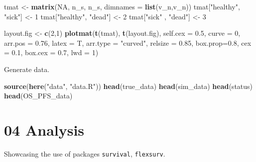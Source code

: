 \documentclass[
]{article}
\newenvironment{Shaded}{\begin{snugshade}}{\end{snugshade}}
\newcommand{\DataTypeTok}[1]{\textcolor[rgb]{0.13,0.29,0.53}{#1}}
\newcommand{\DecValTok}[1]{\textcolor[rgb]{0.00,0.00,0.81}{#1}}
\newcommand{\FloatTok}[1]{\textcolor[rgb]{0.00,0.00,0.81}{#1}}
\newcommand{\KeywordTok}[1]{\textcolor[rgb]{0.13,0.29,0.53}{\textbf{#1}}}
\newcommand{\NormalTok}[1]{#1}
\newcommand{\OtherTok}[1]{\textcolor[rgb]{0.56,0.35,0.01}{#1}}
\newcommand{\StringTok}[1]{\textcolor[rgb]{0.31,0.60,0.02}{#1}}
\begin{document}
\begin{Shaded}
\begin{Highlighting}[]
\NormalTok{tmat <-}\StringTok{ }\KeywordTok{matrix}\NormalTok{(}\OtherTok{NA}\NormalTok{, n_s, n_s, }\DataTypeTok{dimnames =} \KeywordTok{list}\NormalTok{(v_n,v_n))}
\NormalTok{tmat[}\StringTok{"healthy"}\NormalTok{, }\StringTok{"sick"}\NormalTok{]  <-}\StringTok{ }\DecValTok{1}
\NormalTok{tmat[}\StringTok{"healthy"}\NormalTok{, }\StringTok{"dead"}\NormalTok{]  <-}\StringTok{ }\DecValTok{2}
\NormalTok{tmat[}\StringTok{"sick"}\NormalTok{   , }\StringTok{"dead"}\NormalTok{]  <-}\StringTok{ }\DecValTok{3}

\NormalTok{layout.fig <-}\StringTok{ }\KeywordTok{c}\NormalTok{(}\DecValTok{2}\NormalTok{,}\DecValTok{1}\NormalTok{)}
\KeywordTok{plotmat}\NormalTok{(}\KeywordTok{t}\NormalTok{(tmat), }\KeywordTok{t}\NormalTok{(layout.fig), }\DataTypeTok{self.cex =} \FloatTok{0.5}\NormalTok{, }\DataTypeTok{curve =} \DecValTok{0}\NormalTok{, }\DataTypeTok{arr.pos =} \FloatTok{0.76}\NormalTok{,  }
        \DataTypeTok{latex =}\NormalTok{ T, }\DataTypeTok{arr.type =} \StringTok{"curved"}\NormalTok{, }\DataTypeTok{relsize =} \FloatTok{0.85}\NormalTok{, }\DataTypeTok{box.prop=}\FloatTok{0.8}\NormalTok{, }
        \DataTypeTok{cex =} \FloatTok{0.1}\NormalTok{, }\DataTypeTok{box.cex =} \FloatTok{0.7}\NormalTok{, }\DataTypeTok{lwd =} \DecValTok{1}\NormalTok{)}
\end{Highlighting}
\end{Shaded}

Generate data.

\begin{Shaded}
\begin{Highlighting}[]
\KeywordTok{source}\NormalTok{(}\KeywordTok{here}\NormalTok{(}\StringTok{"data"}\NormalTok{, }\StringTok{"data.R"}\NormalTok{))}
\KeywordTok{head}\NormalTok{(true_data)}
\KeywordTok{head}\NormalTok{(sim_data)}
\KeywordTok{head}\NormalTok{(status)}
\KeywordTok{head}\NormalTok{(OS_PFS_data)}
\end{Highlighting}
\end{Shaded}

\hypertarget{analysis}{%
\section{04 Analysis}\label{analysis}}

Showcasing the use of packages \texttt{survival}, \texttt{flexsurv}.
\end{document}
